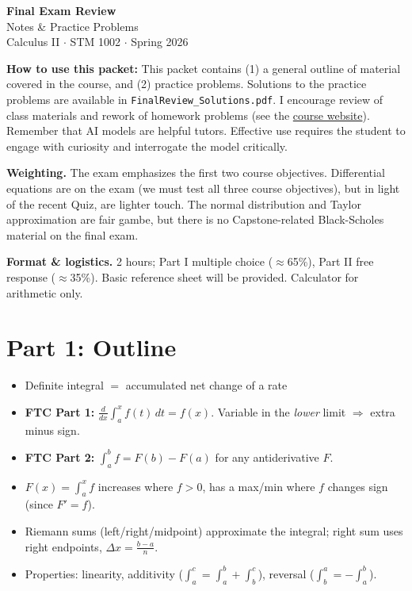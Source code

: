 \documentclass[11pt]{article}
\newcommand{\strand}[1]{%
  \vspace{0.8em}%
  \noindent{\large\textbf{\textcolor{secblue}{#1}}}\par\vspace{0.2em}%
}
\begin{document}
\begin{center}
{\LARGE \textbf{Final Exam Review}}\\[5pt]
{\large Notes \& Practice Problems}\\[3pt]
{\large Calculus II $\cdot$ STM 1002 $\cdot$ Spring 2026}
\end{center}

\begin{notebox}
\textbf{How to use this packet:} This packet contains (1) a general outline of material covered in the course, and (2) practice problems. Solutions to the practice problems are available in \texttt{FinalReview\_Solutions.pdf}. I encourage review of class materials and rework of homework problems (see the \href{https://github.com/d-dickmann/UATX-Calculus-II-SP2026/}{course website}). Remember that AI models are helpful tutors. Effective use requires the student to engage with curiosity and interrogate the model critically.

\smallskip
\textbf{Weighting.} The exam emphasizes the first two course objectives. Differential equations are on the exam (we must test all three course objectives), but in light of the recent Quiz, are lighter touch. The normal distribution and Taylor approximation are fair gambe, but there is no Capstone-related Black-Scholes material on the final exam.

\smallskip
\textbf{Format \& logistics.} 2 hours; Part I multiple choice ($\approx$65\%), Part II free response ($\approx$35\%). Basic reference sheet will be provided. Calculator for arithmetic only.
\end{notebox}

\section*{Part 1: Outline}

\strand{1.\quad Accumulation \& the Fundamental Theorem (Objective 1)}
\begin{itemize}[leftmargin=1.5em, itemsep=1pt]
  \item Definite integral $=$ accumulated net change of a rate
  \item \textbf{FTC Part 1:} $\frac{d}{dx}\int_a^x f(t)\,dt = f(x)$. Variable in the \emph{lower} limit $\Rightarrow$ extra minus sign.
  \item \textbf{FTC Part 2:} $\int_a^b f = F(b) - F(a)$ for any antiderivative $F$.
  \item $F(x)=\int_a^x f$ increases where $f>0$, has a max/min where $f$ changes sign (since $F'=f$).
  \item Riemann sums (left/right/midpoint) approximate the integral; right sum uses right endpoints, $\Delta x = \frac{b-a}{n}$.
  \item Properties: linearity, additivity ($\int_a^c=\int_a^b+\int_b^c$), reversal ($\int_b^a=-\int_a^b$).
\end{itemize}
\end{document}
